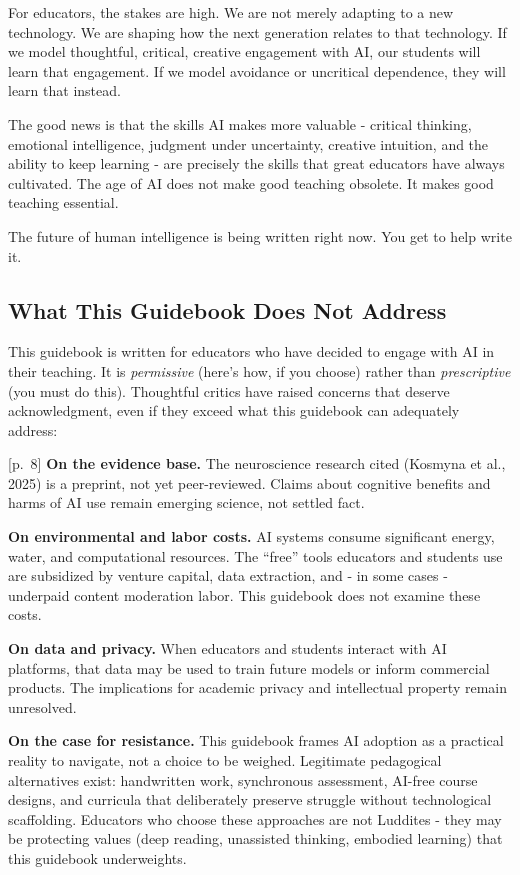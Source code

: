 \documentclass[
  letterpaper,
  DIV=11,
  numbers=noendperiod]{scrreprt}
\begin{document}
For educators, the stakes are high. We are not merely adapting to a new
technology. We are shaping how the next generation relates to that
technology. If we model thoughtful, critical, creative engagement with
AI, our students will learn that engagement. If we model avoidance or
uncritical dependence, they will learn that instead.

The good news is that the skills AI makes more valuable - critical
thinking, emotional intelligence, judgment under uncertainty, creative
intuition, and the ability to keep learning - are precisely the skills
that great educators have always cultivated. The age of AI does not make
good teaching obsolete. It makes good teaching essential.

The future of human intelligence is being written right now. You get to
help write it.

\subsection{What This Guidebook Does Not
Address}\label{what-this-guidebook-does-not-address}

This guidebook is written for educators who have decided to engage with
AI in their teaching. It is \emph{permissive} (here's how, if you
choose) rather than \emph{prescriptive} (you must do this). Thoughtful
critics have raised concerns that deserve acknowledgment, even if they
exceed what this guidebook can adequately address:

{[}p.~8{]} \textbf{On the evidence base.} The neuroscience research
cited (Kosmyna et al., 2025) is a preprint, not yet peer-reviewed.
Claims about cognitive benefits and harms of AI use remain emerging
science, not settled fact.

\textbf{On environmental and labor costs.} AI systems consume
significant energy, water, and computational resources. The ``free''
tools educators and students use are subsidized by venture capital, data
extraction, and - in some cases - underpaid content moderation labor.
This guidebook does not examine these costs.

\textbf{On data and privacy.} When educators and students interact with
AI platforms, that data may be used to train future models or inform
commercial products. The implications for academic privacy and
intellectual property remain unresolved.

\textbf{On the case for resistance.} This guidebook frames AI adoption
as a practical reality to navigate, not a choice to be weighed.
Legitimate pedagogical alternatives exist: handwritten work, synchronous
assessment, AI-free course designs, and curricula that deliberately
preserve struggle without technological scaffolding. Educators who
choose these approaches are not Luddites - they may be protecting values
(deep reading, unassisted thinking, embodied learning) that this
guidebook underweights.
\end{document}
